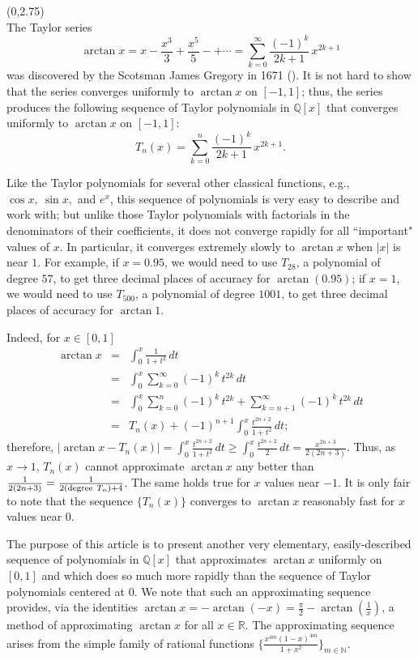 \documentclass[a0]{a0poster}
\theoremstyle{definition}
\def\LHead#1{\noindent{\bf \LARGE\color{DarkBlue} #1}\smallskip}
\newcommand{\dis}{\displaystyle}
\begin{document}
\begin{textblock}{7}(0,2.75)
\LHead{Introduction}\\
The Taylor series
$$ \arctan x = x - \frac{x^3}{3} + \frac{x^5}{5} - +
\cdots = \sum_{k=0}^\infty \frac{(-1)^k}{2k+1}\, x^{2k+1}$$
was discovered by the Scotsman James Gregory in 1671 (\cite[Ch.]{B}).
It is not hard to show that the
series converges uniformly to $\arctan x$ on
$[-1,1]$; thus, the series produces the
following sequence of Taylor polynomials in $\mathbb{Q}[x]$
that converges uniformly to $\arctan x$
on $[-1,1]$:
$$T_n(x) = \sum_{k=0}^n \frac{(-1)^k}{2k+1}\, x^{2k+1}.$$

Like the Taylor polynomials for several other classical functions, e.g.,
$\cos x,\ \sin x,$ and $e^x$, this sequence of polynomials is very easy to describe and
work with; but unlike those Taylor polynomials with factorials in the denominators of their
coefficients, it does not converge rapidly for all ``important" values of $x$.
In particular, it converges extremely slowly to $\arctan x$ when $|x|$ is near $1$.
For example, if $x=0.95$, we would need to use
$T_{28}$, a polynomial of degree $57$, to get three decimal places of
accuracy for $\arctan (0.95)$; if $x=1$, we would need to use
$T_{500}$, a polynomial of degree $1001$, to get three decimal places
of accuracy for $\arctan 1$.

Indeed, for $x\in[0,1]$
\begin{eqnarray*}
\arctan x &=& \int_0^x \frac{1}{1+t^2}\,dt \\
&=& \int_0^x \sum_{k=0}^\infty (-1)^k\, t^{2k}\,dt\\
&=&\int_0^x \sum_{k=0}^n (-1)^k\, t^{2k} + \sum_{k=n+1}^\infty (-1)^k\, t^{2k}\,dt\\
&=&T_n(x) + (-1)^{n+1} \int_0^x \frac{t^{2n+2}}{1+t^2}\,dt;
\end{eqnarray*}
therefore, $\dis|\arctan x - T_n(x)| = \int_0^x \frac{t^{2n+2}}{1+t^2}\,dt
\geq \int_0^x \frac{t^{2n+2}}{2}\,dt = \frac{x^{2n+3}}{2(2n+3)}$.
Thus, as $x\to 1$, $T_n(x)$ cannot approximate $\arctan x$ any better
than $\frac{1}{2(2n+3)} = \frac{1}{2({\rm degree\ }T_n) + 4}$.
The same holds true for $x$ values near $-1$. It is only fair to note that the sequence
$\{T_n(x)\}$ converges to $\arctan x$ reasonably
fast for $x$ values near $0$.

The purpose of this article is to present  another very elementary,
easily-described
sequence of polynomials in $\mathbb{Q}[x]$
that approximates $\arctan x$ uniformly on $[0,1]$
and which does so much more rapidly than the sequence of
Taylor polynomials centered at $0$. We note that
such an approximating sequence provides,
via the identities $\arctan x = -\arctan (-x)=\frac{\pi}{2} -
\arctan (\frac{1}{x})$, a method of approximating $\arctan x$ for
all $x\in\mathbb{R}$.
The approximating sequence arises from the simple family of rational functions
$\dis\Big\{\frac{x^{4m}(1-x)^{4m}}{1+x^2}\Big\}_{m\in\mathbb{N}}$.
\end{textblock}
\end{document}
